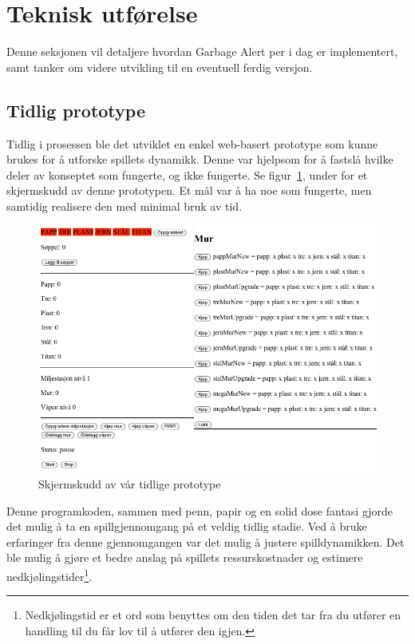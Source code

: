 \section{Teknisk utførelse}\label{sec:teknisk}
Denne seksjonen vil detaljere hvordan Garbage Alert per i dag er
implementert, samt tanker om videre utvikling til en eventuell ferdig
versjon.
\subsection{Tidlig prototype}
Tidlig i prosessen ble det utviklet en enkel web-basert prototype som
kunne brukes for å utforske spillets dynamikk. Denne var hjelpsom for å
fastslå hvilke deler av konseptet som fungerte, og ikke fungerte. Se
figur~\ref{fig:screenshot_tidlig_prototype}, under for et skjermskudd av
denne prototypen. Et mål var å ha noe som fungerte, men samtidig
realisere den med minimal bruk av tid.
\begin{figure} [H]
	\begin{center}
	\includegraphics[scale=0.5]{images/screenshot_tidlig_prototype.png}
	\end{center}
	\caption{Skjermskudd av vår tidlige prototype}
	\label{fig:screenshot_tidlig_prototype}
\end{figure}

Denne programkoden, sammen med penn, papir og en solid dose fantasi
gjorde det mulig å ta en spillgjennomgang på et veldig tidlig stadie.
Ved å bruke erfaringer fra denne gjennomgangen var det mulig å justere
spilldynamikken. Det ble mulig å gjøre et bedre anslag på spillets
ressurskostnader og estimere
nedkjølingstider\footnote{Nedkjølingstid er et ord som benyttes om den
tiden det tar fra du utfører en handling til du får lov til å utfører
den igjen.}.

